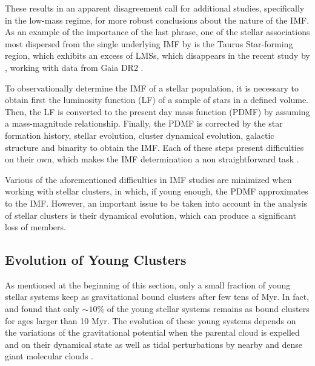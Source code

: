 \documentclass[12pt]{article}
\begin{document}
These results in an apparent disagreement call for additional studies, specifically in the low-mass regime, for more robust conclusions about the nature of the IMF. As an example of the importance of the last phrase, one of the stellar associations most dispersed from the single underlying IMF by \citet{Bastian2010} is the Taurus Star-forming region, which exhibits an excess of LMSs, which disappears in the recent study by \citet{Luhman2018}, working with data from \ac{Gaia DR2} \citep{GaiaCollaboration2018}.



To observationally determine the IMF of a stellar population, it is necessary to obtain first the luminosity function (\ac{LF}) of a sample of stars in a defined volume. Then, the LF is converted to the present day mass function (\ac{PDMF}) by assuming a mass-magnitude relationship. Finally, the PDMF is corrected by the star formation history, stellar evolution, cluster dynamical evolution, galactic structure and binarity to obtain the IMF. Each of these steps present difficulties on their own, which makes the IMF determination a non straightforward task \citep[e.g. ][]{Zinnecker2005,MaizApellaniz-Ubeda2005,Ascenso2011,Stassun2014b}. 

Various of the aforementioned difficulties in IMF studies are minimized when working with stellar clusters, in which, if young enough, the PDMF approximates to the IMF. However, an important issue to be taken into account in the analysis of stellar clusters is their dynamical evolution, which can produce a significant loss of members.

\subsection{Evolution of Young Clusters}
As mentioned at the beginning of this section, only a small fraction of young stellar systems keep as gravitational bound clusters after few tens of Myr. In fact, \citet{Lada-Lada2003} and \citet{Bonatto-Bica2011} found that only $\sim10\%$ of the young stellar systems remains as bound clusters for ages larger than 10 Myr. The evolution of these young systems depends on the variations of the gravitational potential when the parental cloud is expelled \citep[e.g. ][]{Baumgardt-Kroupa2007} and on their dynamical state \citep[contracting, expanding or in equilibrium, e.g.  ][]{Kuhn2018} as well as tidal perturbations by nearby and dense giant molecular clouds \citep{Kruijssen2012}.
\end{document}
